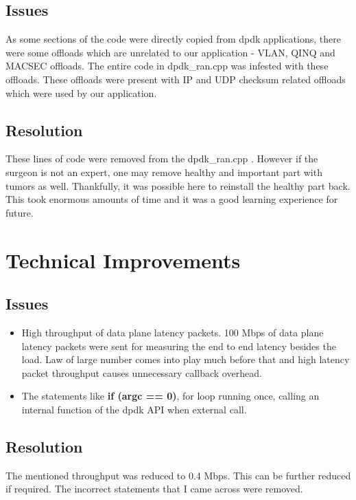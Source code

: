 \subsection{Issues}
As some sections of the code were directly copied from dpdk applications, there were 
some offloads which are unrelated to our application - VLAN, QINQ and MACSEC offloads.
The entire code in dpdk\_ran.cpp was infested with these offloads. These offloads were present with IP
and UDP checksum related offloads which were used by our application.
\subsection{Resolution}
These lines of code were removed from the dpdk\_ran.cpp . However if the surgeon is not an expert,
one may remove healthy and important part with tumors as well. Thankfully, it was possible here 
to reinstall the healthy part back. This took enormous amounts of time and it was a good learning experience
for future.

\section{Technical Improvements}
\subsection{Issues}
\begin{itemize}
	\item High throughput of data plane latency packets. 100 Mbps of data plane latency packets were sent for measuring the 
	end to end latency besides the load. Law of large number comes into play much before that and high latency packet throughput 
	causes unnecessary callback overhead.
	\item The statements like \textbf{if (argc == 0)}, for loop running once, calling an internal function of the
	dpdk API when external call. 
\end{itemize}

\subsection{Resolution}
The mentioned throughput was reduced to 0.4 Mbps. This can be further reduced if required.
The incorrect statements that I came across were removed.
